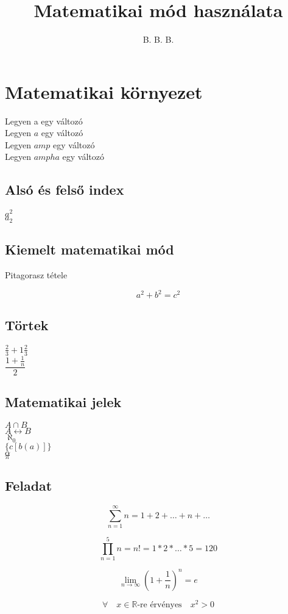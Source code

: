 \documentclass[12pt]{article}
\title{Matematikai mód használata}
\author{B. B. B.}
\begin{document}
\maketitle
\section{Matematikai környezet}
Legyen a egy változó\\
Legyen $a$ egy változó\\
Legyen $amp$ egy változó\\
Legyen $amp ha$ egy változó\\
\subsection{Alsó és felső index}
$a^{2}$\\
$a_{2}$
\subsection{Kiemelt matematikai mód}
\begin{center}
Pitagorasz tétele
\end{center} 
$$ a^{2}+b^{2}=c^{2} $$
\subsection{Törtek}

$\frac{2}{3}+1\frac{2}{3}$\\
$\dfrac{1+\frac{1}{n}}{2}$
\newpage
\subsection{Matematikai jelek}
$A \cap B$\\
$A \longleftrightarrow B$\\
$\aleph_{0}$\\
$\lbrace c[b(a)]\rbrace$\\
$\alpha$\\
$\pi$\\
\subsection{Feladat}
$$
\sum_{n=1}^{\infty}n=1+2+\ldots+n+\ldots
$$

$$
\prod^{5}_{n=1}n=n! = 1 \ast 2 \ast \ldots \ast 5 = 120
$$

$$
\lim_{n\longrightarrow \infty} \left(1+ \dfrac{1}{n}\right)^n = e
$$

$$
\forall \quad x \in \mathbb{R} \textrm{-re érvényes} \quad x^{2}>0
$$
\end{document}
